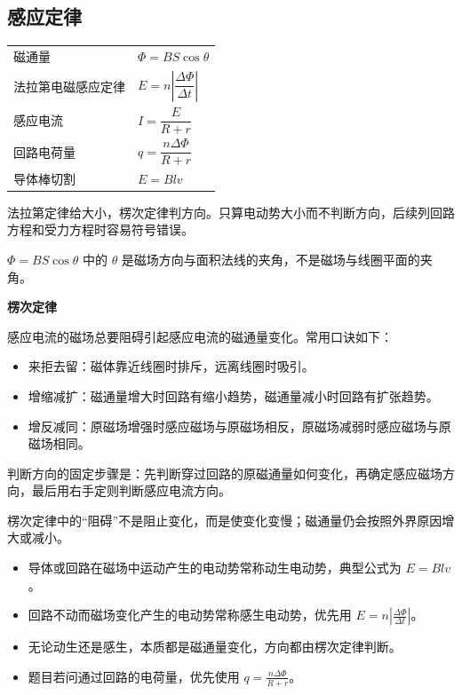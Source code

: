 
\subsection{感应定律}

\begin{tabularx}{\columnwidth}{XX}
  磁通量&$\Phi=BS\cos\theta$\\
  法拉第电磁感应定律&$E=n\left|\dfrac{\Delta\Phi}{\Delta t}\right|$\\
  感应电流&$I=\dfrac{E}{R+r}$\\
  回路电荷量&$q=\dfrac{n\Delta\Phi}{R+r}$\\
  导体棒切割&$E=Blv$\\
\end{tabularx}

\begin{formulanotebox}
法拉第定律给大小，楞次定律判方向。只算电动势大小而不判断方向，后续列回路方程和受力方程时容易符号错误。

$\Phi=BS\cos\theta$ 中的 $\theta$ 是磁场方向与面积法线的夹角，不是磁场与线圈平面的夹角。
\end{formulanotebox}

\textbf{楞次定律}

感应电流的磁场总要阻碍引起感应电流的磁通量变化。常用口诀如下：

\begin{itemize}[leftmargin=1.5em]
  \item 来拒去留：磁体靠近线圈时排斥，远离线圈时吸引。
  \item 增缩减扩：磁通量增大时回路有缩小趋势，磁通量减小时回路有扩张趋势。
  \item 增反减同：原磁场增强时感应磁场与原磁场相反，原磁场减弱时感应磁场与原磁场相同。
\end{itemize}

\begin{keypointbox}[title={\strut\textcolor{white}{\bfseries 重点知识点：感应电流方向}}]
判断方向的固定步骤是：先判断穿过回路的原磁通量如何变化，再确定感应磁场方向，最后用右手定则判断感应电流方向。

楞次定律中的“阻碍”不是阻止变化，而是使变化变慢；磁通量仍会按照外界原因增大或减小。
\end{keypointbox}

\begin{casetypebox}[title={\strut\textcolor{white}{\bfseries 常见题型：动生与感生电动势}}]
\begin{itemize}[leftmargin=1.5em]
  \item 导体或回路在磁场中运动产生的电动势常称动生电动势，典型公式为 $E=Blv$。
  \item 回路不动而磁场变化产生的电动势常称感生电动势，优先用 $E=n\left|\frac{\Delta\Phi}{\Delta t}\right|$。
  \item 无论动生还是感生，本质都是磁通量变化，方向都由楞次定律判断。
  \item 题目若问通过回路的电荷量，优先使用 $q=\frac{n\Delta\Phi}{R+r}$。
\end{itemize}
\end{casetypebox}
